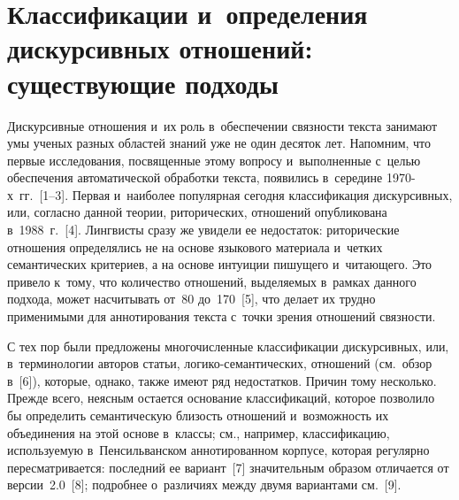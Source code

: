     
    
  
\vspace*{-1pt}



\thispagestyle{headings}

\begin{multicols}{2}

\label{st\stat}
    
\section{Классификации и~определения дискурсивных отношений: 
существующие подходы}

   Дискурсивные отношения и~их роль в~обеспечении связности текста 
занимают умы ученых разных областей знаний уже не один десяток лет. 
Напомним, что первые исследования, посвященные этому вопросу 
и~выполненные с~целью обеспечения автоматической обработки текста, 
появились в~середине 1970-х~гг.~[1--3]. Первая и~наиболее популярная 
сегодня классификация дискурсивных, или, согласно данной теории, 
риторических, отношений опубликована в~1988~г.~[4]. Лингвисты сразу же 
увидели ее недостаток: риторические отношения определялись не на основе 
языкового материала и~четких семантических критериев, а на основе интуиции 
пишущего и~читающего. Это привело к~тому, что количество отношений, 
выделяемых в~рамках данного подхода, может насчитывать от~80 до~170~[5], 
что делает их трудно применимыми для аннотирования текста с~точки зрения 
отношений связности. 
   
   С тех пор были предложены многочисленные классификации 
дискурсивных, или, в~терминологии авторов статьи, логико-семантических, 
отношений (см.\ обзор в~[6]), которые, однако, также имеют ряд недостатков. 
Причин тому несколько. Прежде всего, неясным остается основание 
классификаций, которое позволило бы определить семантическую близость 
отношений и~возможность их объединения на этой основе в~классы; см., 
например, классификацию, используемую в~Пенсильванском аннотированном 
корпусе, которая регулярно пересматривается: последний ее вариант~[7] 
значительным образом отличается от версии~2.0~[8]; подробнее о~различиях 
между двумя вариантами см.~[9].
{

}
    

\end{multicols}
